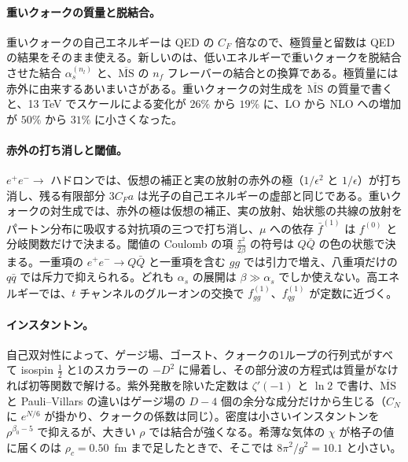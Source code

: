 \documentclass[a4paper,10pt]{ltjsarticle}
\newcommand{\MSbar}{\overline{\mathrm{MS}}}
\begin{document}
\paragraph{重いクォークの質量と脱結合。}重いクォークの自己エネルギーは QED の $C_F$ 倍なので、極質量と留数は QED の結果をそのまま使える。新しいのは、低いエネルギーで重いクォークを脱結合させた結合 $\alpha_s^{(n_l)}$ と、$\MSbar$ の $n_f$ フレーバーの結合との換算である。極質量には赤外に由来するあいまいさがある。重いクォークの対生成を $\MSbar$ の質量で書くと、13 TeV でスケールによる変化が $26\%$ から $19\%$ に、LO から NLO への増加が $50\%$ から $31\%$ に小さくなった。

\paragraph{赤外の打ち消しと閾値。}$e^+e^-\to$ ハドロンでは、仮想の補正と実の放射の赤外の極（$1/\epsilon^2$ と $1/\epsilon$）が打ち消し、残る有限部分 $3C_Fa$ は光子の自己エネルギーの虚部と同じである。重いクォークの対生成では、赤外の極は仮想の補正、実の放射、始状態の共線の放射をパートン分布に吸収する対抗項の三つで打ち消し、$\mu$ への依存 $\bar f^{(1)}$ は $f^{(0)}$ と分岐関数だけで決まる。閾値の Coulomb の項 $\frac{\pi^2}{2\beta}$ の符号は $Q\bar Q$ の色の状態で決まる。一重項の $e^+e^-\to Q\bar Q$ と一重項を含む $gg$ では引力で増え、八重項だけの $q\bar q$ では斥力で抑えられる。どれも $\alpha_s$ の展開は $\beta\gg\alpha_s$ でしか使えない。高エネルギーでは、$t$ チャンネルのグルーオンの交換で $f^{(1)}_{gg}$、$f^{(1)}_{qg}$ が定数に近づく。

\paragraph{インスタントン。}自己双対性によって、ゲージ場、ゴースト、クォークの1ループの行列式がすべて isospin $\frac12$ と1のスカラーの $-D^2$ に帰着し、その部分波の方程式は質量がなければ初等関数で解ける。紫外発散を除いた定数は $\zeta'(-1)$ と $\ln2$ で書け、$\MSbar$ と Pauli--Villars の違いはゲージ場の $D-4$ 個の余分な成分だけから生じる（$C_N$ に $e^{N/6}$ が掛かり、クォークの係数は同じ）。密度は小さいインスタントンを $\rho^{\beta_0-5}$ で抑えるが、大きい $\rho$ では結合が強くなる。希薄な気体の $\chi$ が格子の値に届くのは $\rho_c=0.50$~fm まで足したときで、そこでは $8\pi^2/g^2=10.1$ と小さい。
\end{document}
